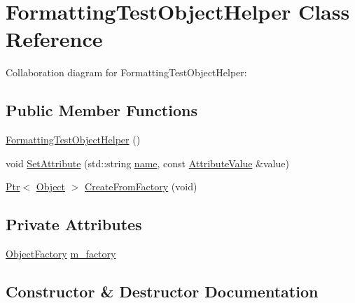 \hypertarget{classFormattingTestObjectHelper}{}\section{Formatting\+Test\+Object\+Helper Class Reference}
\label{classFormattingTestObjectHelper}


Collaboration diagram for Formatting\+Test\+Object\+Helper\+:
\subsection*{Public Member Functions}
\begin{DoxyCompactItemize}
\item 
\hyperlink{classFormattingTestObjectHelper_a66aee55f7e17c5da89e435e6ec8ebdd9}{Formatting\+Test\+Object\+Helper} ()
\item 
void \hyperlink{classFormattingTestObjectHelper_a8d4707dad43d9743bd98d1ffc8663e65}{Set\+Attribute} (std\+::string \hyperlink{generate__test__data__lte__spectrum__model_8m_ab74e6bf80237ddc4109968cedc58c151}{name}, const \hyperlink{classns3_1_1AttributeValue}{Attribute\+Value} \&value)
\item 
\hyperlink{classns3_1_1Ptr}{Ptr}$<$ \hyperlink{classns3_1_1Object}{Object} $>$ \hyperlink{classFormattingTestObjectHelper_af0dfab60b9d8fe2e68eff88c135d3d22}{Create\+From\+Factory} (void)
\end{DoxyCompactItemize}
\subsection*{Private Attributes}
\begin{DoxyCompactItemize}
\item 
\hyperlink{classns3_1_1ObjectFactory}{Object\+Factory} \hyperlink{classFormattingTestObjectHelper_a605f374bfa696679039a42050bbc4d4e}{m\+\_\+factory}
\end{DoxyCompactItemize}


\subsection{Constructor \& Destructor Documentation}
